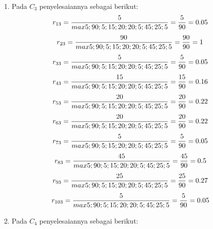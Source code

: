 \begin{enumerate}
\item Pada $C_{3}$ penyelesaiannya sebagai berikut:
\begin{displaymath}
r_{13} = \frac{5}{max {5;90;5;15;20;20;5;45;25;5}} = \frac{5}{90} = 0.05\\
\end {displaymath}
\begin{displaymath}
r_{23} = \frac{90}{max {5;90;5;15;20;20;5;45;25;5}} = \frac{90}{90} = 1\\
\end{displaymath}
\begin{displaymath}
r_{33} = \frac{5}{max {5;90;5;15;20;20;5;45;25;5}} = \frac{5}{90} = 0.05\\
\end {displaymath}
\begin{displaymath}
r_{43} = \frac{15}{max {5;90;5;15;20;20;5;45;25;5}} = \frac{15}{90} = 0.16\\
\end {displaymath}
\begin{displaymath}
r_{53} = \frac{20}{max {5;90;5;15;20;20;5;45;25;5}} = \frac{20}{90} = 0.22\\
\end {displaymath}
\begin{displaymath}
r_{63} = \frac{20}{max {5;90;5;15;20;20;5;45;25;5}} = \frac{20}{90} = 0.22\\
\end {displaymath}
\begin{displaymath}
r_{73} = \frac{5}{max {5;90;5;15;20;20;5;45;25;5}} = \frac{5}{90} = 0.05\\
\end {displaymath}
\begin{displaymath}
r_{83} = \frac{45}{max {5;90;5;15;20;20;5;45;25;5}} = \frac{45}{90} = 0.5\\
\end {displaymath}
\begin{displaymath}
r_{93} = \frac{25}{max {5;90;5;15;20;20;5;45;25;5}} = \frac{25}{90} = 0.27\\
\end {displaymath}
\begin{displaymath}
r_{103} = \frac{5}{max {5;90;5;15;20;20;5;45;25;5}} = \frac{5}{90} = 0.05\\
\end {displaymath}
\item Pada $C_{4}$ penyelesaiannya sebagai berikut:
\begin{displaymath}

\end{displaymath}
\end{enumerate}
